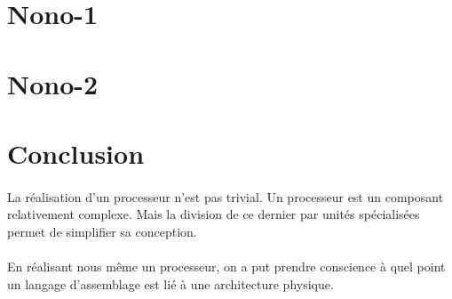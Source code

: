 \documentclass[a4paper]{article}
\begin{document}
	\newpage	
		\section{Nono-1}
			
		\section{Nono-2}
			
	

	
	
	\newpage
	\section*{Conclusion}
		\paragraph{}{
		La réalisation d'un processeur n'est pas trivial. Un processeur est un 
		composant relativement complexe. Mais la division de ce dernier par unités
		spécialisées permet de simplifier sa conception. \newline
		}
		
		\paragraph{}{
		En réalisant nous même un processeur, on a put prendre conscience à 
		quel point un langage d'assemblage est lié à une architecture physique.
		}
		
	\newpage
	\listoffigures
		
\end{document}
